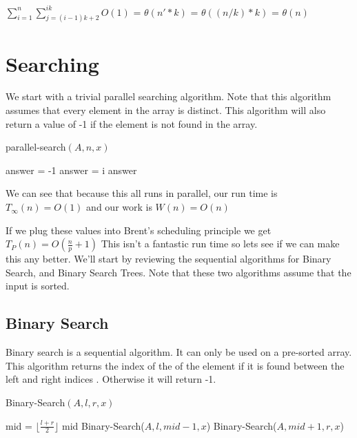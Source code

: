 \documentclass[11pt]{article}
\begin{document}
$\sum_{i=1}^{n} \sum_{j=(i-1)k+2}^{ik}O(1)$ =
$\theta(n'*k)$ =
$\theta((n/k) * k)$ = $\theta(n)$

\section{Searching}

We start with a trivial parallel searching algorithm. Note that this algorithm assumes that every element in the array is distinct. This algorithm will also return a value of -1 if the element is not found in the array.

\begin{algorithm}
\caption{parallel-search$(A,n,x)$}
\begin{algorithmic}
\STATE answer = -1
	    \STATE answer = i
	\ENDIF
\ENDFOR
\RETURN answer
\end{algorithmic}
\end{algorithm}

We can see that because this all runs in parallel, our run time is $T_\infty(n) = O(1)$ and our work is $W(n) = O(n)$

If we plug these values into Brent's scheduling principle we get
$T_P(n) = O(\frac{n}{p}+1)$ This isn't a fantastic run time so lets see if we can make this any better. We'll start by reviewing the sequential algorithms for Binary Search, and Binary Search Trees. Note that these two algorithms assume that the input is sorted.

\subsection{Binary Search}
Binary search is a sequential algorithm. It can only be used on a pre-sorted array. This algorithm returns the index of the of the element if it is found between the left and right indices . Otherwise it will return -1.
\pagebreak


\begin{algorithm}
\caption{Binary-Search$(A,l,r,x)$}
\begin{algorithmic}
\ELSE
    \STATE mid = $\lfloor\frac{l+r}{2}\rfloor$
        \RETURN mid
        \RETURN Binary-Search($A,l,mid-1,x$)
    \ELSE
        \RETURN Binary-Search($A,mid+1,r,x$)
    \ENDIF
\ENDIF
\end{algorithmic}
\end{algorithm}
\end{document}
